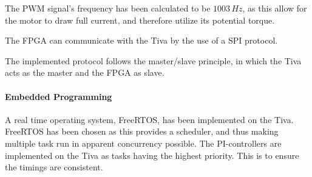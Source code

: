 \documentclass[../../main]{subfiles}
\begin{document}
The PWM signal's frequency has been calculated to be $1003 \si{\,Hz}$, as this allow for the motor to draw full current, and therefore utilize its potential torque.

The FPGA can communicate with the Tiva by the use of a SPI protocol.

The implemented protocol follows the master/slave principle, in which the Tiva acts as the master and the FPGA as slave.

\paragraph{Embedded Programming}
A real time operating system, FreeRTOS, has been implemented on the Tiva. FreeRTOS has been chosen as this provides a scheduler, and thus making multiple task run in apparent concurrency possible.
The PI-controllers are implemented on the Tiva as tasks having the highest priority. This is to ensure the timings are consistent.
\end{document}
